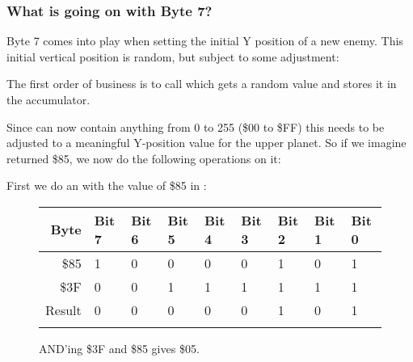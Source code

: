 \subsubsection{What is going on with Byte 7?}

Byte 7 comes into play when setting the initial Y position of a new enemy. This initial vertical
position is random, but subject to some adjustment:

%


The first order of business is to call  which gets a random value and stores it in the accumulator.

%


Since  can now contain anything from 0 to 255 (\$00 to \$FF) this needs to be adjusted to a meaningful Y-position
value for the upper planet. So if we imagine  returned \$85, we now do the
following operations on it:

%


First we do an  with the value of \$85 in :
\begin{figure}[H]
  {
    \setlength{\tabcolsep}{3.0pt}
    \setlength\cmidrulewidth{\heavyrulewidth} %
    \begin{adjustbox}{width=10cm,center}

      \begin{tabular}{rllllllll}
        \toprule
        Byte & Bit 7 & Bit 6 & Bit 5 & Bit 4 & Bit 3 & Bit 2 & Bit 1 & Bit 0        \\
        \midrule
        \$85 & 1 & 0 & 0 & 0 & 0 & 1 & 0 & 1 \\
        \$3F & 0 & 0 & 1 & 1 & 1 & 1 & 1 & 1 \\
        \midrule
        Result & 0 & 0 & 0 & 0 & 0 & 1 & 0 & 1 \\
        \addlinespace
        \bottomrule
      \end{tabular}

    \end{adjustbox}

    }\caption*{AND'ing \$3F and \$85 gives \$05.}
\end{figure}

